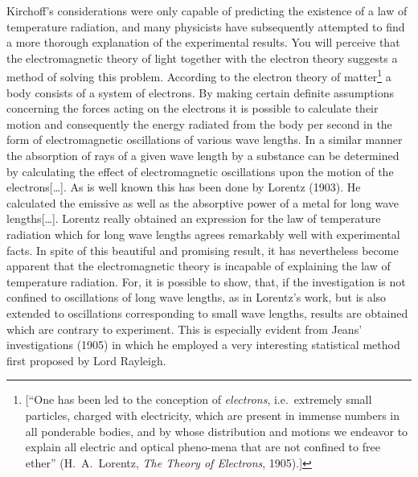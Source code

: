Kirchoff's considerations were only capable of predicting the existence
of a law of temperature radiation, and many physicists have subsequently
attempted to find a more thorough explanation of the experimental
results. You will perceive that the electromagnetic theory of light
together with the electron theory suggests a method of solving this
problem. According to the electron theory of matter\footnote{{[}``One
  has been led to the conception of \emph{electrons}, i.e.\ extremely
  small particles, charged with electricity, which are present in
  immense numbers in all ponderable bodies, and by whose distribution
  and motions we endeavor to explain all electric and optical pheno-mena
  that are not confined to free ether'' (H.\ A.\ Lorentz, \emph{The Theory
  of Electrons}, 1905).{]}} a body consists of a system of electrons. By
making certain definite assumptions concerning the forces acting on the
electrons it is possible to calculate their motion and consequently the
energy radiated from the body per second in the form of electromagnetic
oscillations of various wave lengths. In a similar manner the absorption of 
rays of a given wave length by a substance can be determined by calculating 
the effect of electromagnetic oscillations upon the motion of the 
electrons[\ldots]. As is well known this has been done by Lorentz (1903). 
He calculated the emissive as well as the absorptive power of a metal for 
long wave lengths[\ldots]. Lorentz really obtained an expression for the law 
of temperature radiation which for long wave lengths agrees remarkably well
with experimental facts. In spite of this beautiful and promising
result, it has nevertheless become apparent that the electromagnetic
theory is incapable of explaining the law of temperature radiation. For,
it is possible to show, that, if the investigation is not confined to
oscillations of long wave lengths, as in Lorentz's work, but is also
extended to oscillations corresponding to small wave lengths, results
are obtained which are contrary to experiment. This is especially evident 
from Jeans’ investigations (1905) in which he employed a very interesting 
statistical method first proposed by Lord Rayleigh.

